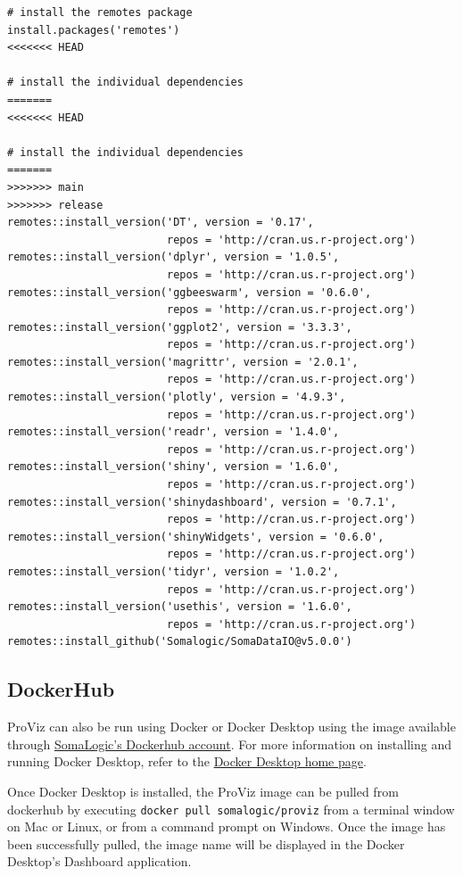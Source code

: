 \documentclass[
]{book}
\begin{document}
\begin{verbatim}
# install the remotes package 
install.packages('remotes')
<<<<<<< HEAD

# install the individual dependencies
=======
<<<<<<< HEAD

# install the individual dependencies
=======
>>>>>>> main
>>>>>>> release
remotes::install_version('DT', version = '0.17', 
                         repos = 'http://cran.us.r-project.org')
remotes::install_version('dplyr', version = '1.0.5',
                         repos = 'http://cran.us.r-project.org')
remotes::install_version('ggbeeswarm', version = '0.6.0',
                         repos = 'http://cran.us.r-project.org')
remotes::install_version('ggplot2', version = '3.3.3',
                         repos = 'http://cran.us.r-project.org')
remotes::install_version('magrittr', version = '2.0.1',
                         repos = 'http://cran.us.r-project.org')
remotes::install_version('plotly', version = '4.9.3',
                         repos = 'http://cran.us.r-project.org')
remotes::install_version('readr', version = '1.4.0',
                         repos = 'http://cran.us.r-project.org')
remotes::install_version('shiny', version = '1.6.0',
                         repos = 'http://cran.us.r-project.org')
remotes::install_version('shinydashboard', version = '0.7.1',
                         repos = 'http://cran.us.r-project.org')
remotes::install_version('shinyWidgets', version = '0.6.0',
                         repos = 'http://cran.us.r-project.org')
remotes::install_version('tidyr', version = '1.0.2',
                         repos = 'http://cran.us.r-project.org')
remotes::install_version('usethis', version = '1.6.0',
                         repos = 'http://cran.us.r-project.org')
remotes::install_github('Somalogic/SomaDataIO@v5.0.0')
\end{verbatim}

\hypertarget{dockerhub}{%
\subsection{DockerHub}\label{dockerhub}}

ProViz can also be run using Docker or Docker Desktop using the image available through \href{https://hub.docker.com/r/somalogic/proviz}{SomaLogic's Dockerhub account}. For more information on installing and running Docker Desktop, refer to the \href{https://www.docker.com/products/docker-desktop}{Docker Desktop home page}.

Once Docker Desktop is installed, the ProViz image can be pulled from dockerhub by executing \texttt{docker\ pull\ somalogic/proviz} from a terminal window on Mac or Linux, or from a command prompt on Windows. Once the image has been successfully pulled, the image name will be displayed in the Docker Desktop's Dashboard application.
\end{document}
